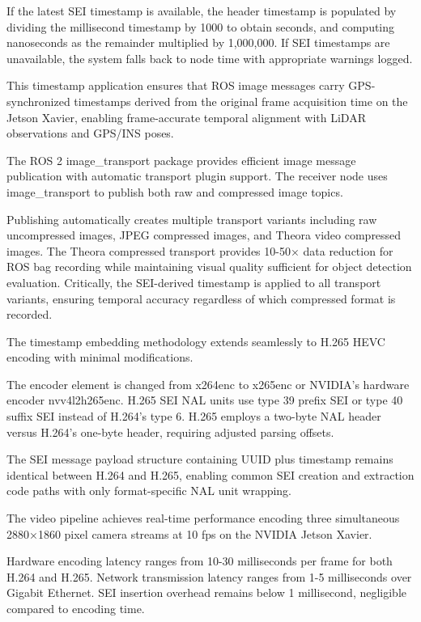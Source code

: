 \documentclass{erauthesis}
\begin{document}
If the latest SEI timestamp is available, the header timestamp is populated by dividing the millisecond timestamp by 1000 to obtain seconds, and computing nanoseconds as the remainder multiplied by 1,000,000.
If SEI timestamps are unavailable, the system falls back to node time with appropriate warnings logged.

This timestamp application ensures that ROS image messages carry GPS-synchronized timestamps derived from the original frame acquisition time on the Jetson Xavier, enabling frame-accurate temporal alignment with LiDAR observations and GPS/INS poses.


The ROS 2 image\_transport package provides efficient image message publication with automatic transport plugin support.
The receiver node uses image\_transport to publish both raw and compressed image topics.

Publishing automatically creates multiple transport variants including raw uncompressed images, JPEG compressed images, and Theora video compressed images.
The Theora compressed transport provides 10-50× data reduction for ROS bag recording while maintaining visual quality sufficient for object detection evaluation.
Critically, the SEI-derived timestamp is applied to all transport variants, ensuring temporal accuracy regardless of which compressed format is recorded.


The timestamp embedding methodology extends seamlessly to H.265 HEVC encoding with minimal modifications.

The encoder element is changed from x264enc to x265enc or NVIDIA's hardware encoder nvv4l2h265enc.
H.265 SEI NAL units use type 39 prefix SEI or type 40 suffix SEI instead of H.264's type 6.
H.265 employs a two-byte NAL header versus H.264's one-byte header, requiring adjusted parsing offsets.

The SEI message payload structure containing UUID plus timestamp remains identical between H.264 and H.265, enabling common SEI creation and extraction code paths with only format-specific NAL unit wrapping.


The video pipeline achieves real-time performance encoding three simultaneous 2880×1860 pixel camera streams at 10 fps on the NVIDIA Jetson Xavier.

Hardware encoding latency ranges from 10-30 milliseconds per frame for both H.264 and H.265.
Network transmission latency ranges from 1-5 milliseconds over Gigabit Ethernet.
SEI insertion overhead remains below 1 millisecond, negligible compared to encoding time.
\end{document}
